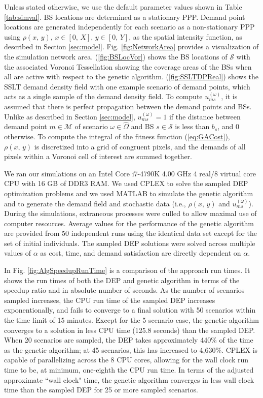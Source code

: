 \documentclass[12pt,dvipsnames]{report}
\begin{document}
Unless stated otherwise, we use the default parameter values shown in Table \ref{tab:simval}.  BS locations are determined as a stationary PPP.  Demand point locations are generated independently for each scenario as a non-stationary PPP using $\rho\left(x,\, y\right),\, x \in [0,\, X],\, y \in [0,\, Y]$, as the spatial intensity function, as described in Section \ref{sec:model}.  Fig. \ref{fig:NetworkArea} provides a visualization of the simulation network area.  (\ref{fig:BSLocVor}) shows the BS locations of $\mathcal{S}$ with the associated Voronoi Tessellation showing the coverage areas of the BSs when all are active with respect to the genetic algorithm.  (\ref{fig:SSLTDPReal}) shows the SSLT demand density field with one example scenario of demand points, which acts as a single sample of the demand density field.  To compute $u_{ms}^{(\omega)}$, it is assumed that there is perfect propagation between the demand points and BSs.  Unlike as described in Section \ref{sec:model}, $u_{ms}^{(\omega)} = 1$ if the distance between demand point $m \in \mathcal{M}$ of scenario $\omega \in \hat{\Omega}$ and BS $s \in \mathcal{S}$ is less than $b_s$, and 0 otherwise.  To compute the integral of the fitness function (\ref{eq:GACost}), $\rho\left(x,\, y\right)$ is discretized into a grid of congruent pixels, and the demands of all pixels within a Voronoi cell of interest are summed together.

We ran our simulations on an Intel Core i7-4790K 4.00 GHz 4 real/8 virtual core CPU with 16 GB of DDR3 RAM.  We used CPLEX \cite{Cplex} to solve the sampled DEP optimization problems and we used MATLAB to simulate the genetic algorithm and to generate the demand field and stochastic data (i.e., $\rho\left(x,\, y\right)$ and $u_{ms}^{(\omega)}$).  During the simulations, extraneous processes were culled to allow maximal use of computer resources.  Average values for the performance of the genetic algorithm are provided from 50 independent runs using the identical data set except for the set of initial individuals.  The sampled DEP solutions were solved across multiple values of $\alpha$ as cost, time, and demand satisfaction are directly dependent on $\alpha$.

In Fig. \ref{fig:AlgSpeedupRunTime} is a comparison of the approach run times.  It shows the run times of both the DEP and genetic algorithm in terms of the speedup ratio and in absolute number of seconds.  As the number of scenarios sampled increases, the CPU run time of the sampled DEP increases exponentionally, and fails to converge to a final solution with 50 scenarios within the time limit of 15 minutes.  Except for the 5 scenario case, the genetic algorithm converges to a solution in less CPU time (125.8 seconds) than the sampled DEP.  When 20 scenarios are sampled, the DEP takes approximately 440\% of the time as the genetic algorithm; at 45 scenarios, this has increased to 4,630\%.  CPLEX is capable of parallelizing across the 8 CPU cores, allowing for the wall clock run time to be, at minimum, one-eighth the CPU run time.  In terms of the adjusted approximate ``wall clock" time, the genetic algorithm converges in less wall clock time than the sampled DEP for 25 or more sampled scenarios.
\end{document}
